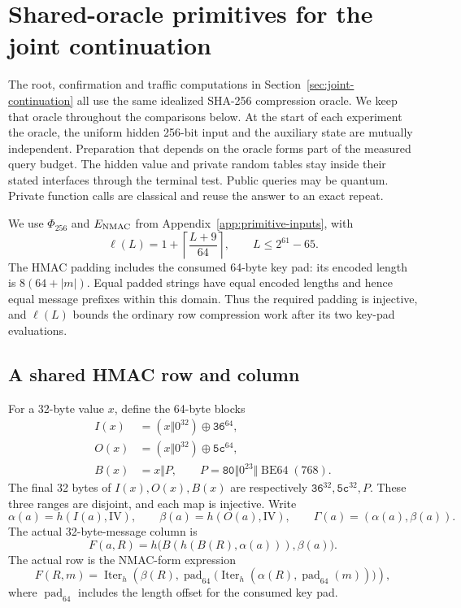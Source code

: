\section{Shared-oracle primitives for the joint continuation}
\label{app:joint-primitives}

The root, confirmation and traffic computations in
Section~\ref{sec:joint-continuation} all use the same idealized SHA-256
compression oracle. We keep that oracle throughout the comparisons
below. At the start of each experiment the oracle, the uniform hidden
256-bit input and the auxiliary state are mutually independent.
Preparation that depends on the oracle forms part of the measured
query budget. The hidden value and private random tables stay inside
their stated interfaces through the terminal test. Public queries may
be quantum. Private function calls are classical and reuse the answer
to an exact repeat.

We use $\Phi_{256}$ and $E_{\rm NMAC}$ from
Appendix~\ref{app:primitive-inputs}, with
\[
 \ell(L)=1+\left\lceil\frac{L+9}{64}\right\rceil,
 \qquad L\le 2^{61}-65.
\]
The HMAC padding includes the consumed 64-byte key pad: its encoded
length is $8(64+|m|)$. Equal padded strings have equal encoded lengths
and hence equal message prefixes within this domain. Thus the required
padding is injective, and $\ell(L)$ bounds the ordinary row compression
work after its two key-pad evaluations.

\subsection{A shared HMAC row and column}
\label{app:joint-row-column}

For a 32-byte value $x$, define the 64-byte blocks
\[
 \begin{split}
 I(x)&=(x\Vert0^{32})\oplus\mathtt{36}^{64},\\
 O(x)&=(x\Vert0^{32})\oplus\mathtt{5c}^{64},\\
 B(x)&=x\Vert P,\qquad
 P=\mathtt{80}\Vert0^{23}\Vert\operatorname{BE64}(768).
 \end{split}
\]
The final 32 bytes of $I(x),O(x),B(x)$ are respectively
$\mathtt{36}^{32},\mathtt{5c}^{32},P$. These three ranges are disjoint,
and each map is injective. Write
\[
 \alpha(a)=h(I(a),\mathrm{IV}),\qquad
 \beta(a)=h(O(a),\mathrm{IV}),\qquad
 \Gamma(a)=(\alpha(a),\beta(a)).
\]
The actual 32-byte-message column is
\begin{equation}
 F(a,R)=h\bigl(B(h(B(R),\alpha(a))),\beta(a)\bigr).
 \label{eq:appendix-column-compression}
\end{equation}
The actual row is the NMAC-form expression
\[
 F(R,m)=\operatorname{Iter}_h\!\left(
 \beta(R),\operatorname{pad}_{64}
 \bigl(\operatorname{Iter}_h(\alpha(R),\operatorname{pad}_{64}(m))\bigr)
 \right),
\]
where $\operatorname{pad}_{64}$ includes the length offset for the consumed key pad.

